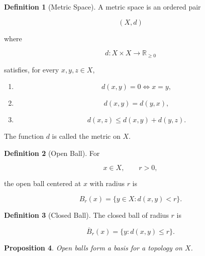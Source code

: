 \documentclass[11pt]{book}
\numberwithin{equation}{chapter}
\theoremstyle{definition}
\newtheorem{definition}{Definition}[chapter]
\theoremstyle{plain}
\newtheorem{proposition}[definition]{Proposition}
\begin{document}
\begin{definition}[Metric Space]

A metric space is an ordered pair

\[
(X,d)
\]

where

\[
d:X\times X\rightarrow\mathbb{R}_{\ge0}
\]

satisfies, for every
\(x,y,z\in X\),

\begin{enumerate}

\item
\[
d(x,y)=0
\iff
x=y,
\]

\item
\[
d(x,y)=d(y,x),
\]

\item
\[
d(x,z)
\le
d(x,y)+d(y,z).
\]

\end{enumerate}

\end{definition}

The function \(d\) is called the metric on \(X\).


\begin{definition}[Open Ball]

For

\[
x\in X,
\qquad
r>0,
\]

the open ball centered at \(x\) with radius \(r\) is

\[
B_r(x)
=
\{
y\in X:
d(x,y)<r
\}.
\]

\end{definition}


\begin{definition}[Closed Ball]

The closed ball of radius \(r\) is

\[
\overline B_r(x)
=
\{
y:
d(x,y)\le r
\}.
\]

\end{definition}


\begin{proposition}

Open balls form a basis for a topology on \(X\).

\end{proposition}
\end{document}
